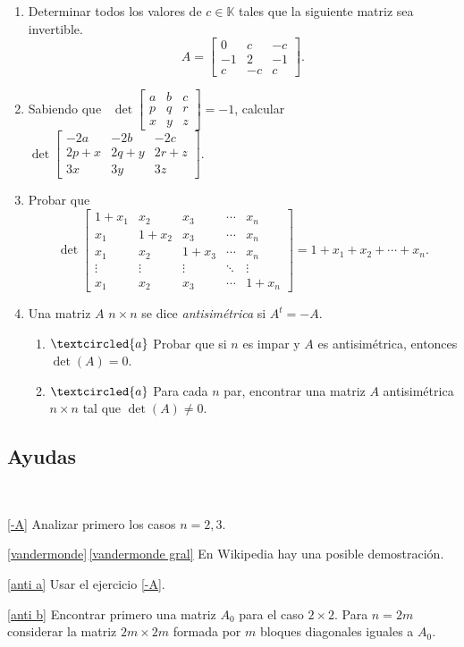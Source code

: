 \begin{enumerate}[resume, topsep=6pt,itemsep=.4cm]
\item Determinar todos los valores de $c\in\mathbb{K}$ tales que la siguiente matriz sea invertible.
$$A=\begin{bmatrix} 0&c&-c\\ -1&2&-1\\c&-c&c\end{bmatrix}.$$


\item Sabiendo que \
$
\det \begin{bmatrix} a&b&c\\ p&q&r\\
x&y&z\end{bmatrix}=-1
$,
calcular \
$
\det \begin{bmatrix} -2a&-2b&-2c\\ 2p+x&2q+y&2r+z\\
3x&3y&3z\end{bmatrix}.
$

\item Probar que
$$
\det\begin{bmatrix}
1+x_1 & x_2 & x_3 & \cdots & x_n \\
x_1 & 1+x_2 & x_3 & \cdots & x_n \\
x_1 & x_2 & 1+x_3 & \cdots & x_n \\
\vdots & \vdots & \vdots &\ddots& \vdots \\
x_1 & x_2 & x_3 & \cdots & 1+x_n
\end{bmatrix}
= 1+x_1+x_2 + \cdots + x_n.
$$


\item
Una matriz $A$ $n \times n$ se dice {\it antisimétrica}
si $A^t=-A$.


\begin{enumerate}
\item\label{anti a} $\textcircled{a}$ Probar que si $n$ es impar y $A$ es antisimétrica, entonces
$\det(A)=0$.


\item\label{anti b} $\textcircled{a}$ Para cada $n$ par, encontrar una matriz $A$ antisimétrica
$n \times n$ tal que $\det(A)\not=0$.
\end{enumerate}
    
    
\end{enumerate}


\subsection*{Ayudas}

\

\ref{-A} Analizar primero los casos $n=2,3$.


\ref{vandermonde}\,\ref{vandermonde gral} En Wikipedia hay una posible demostración.


\ref{anti a} Usar el ejercicio \ref{-A}.


\ref{anti b} Encontrar primero una matriz $A_0$ para el caso $2\times 2$. Para $n = 2m$ considerar la matriz $2m \times 2m$ formada por $m$ bloques diagonales iguales a $A_0$.

